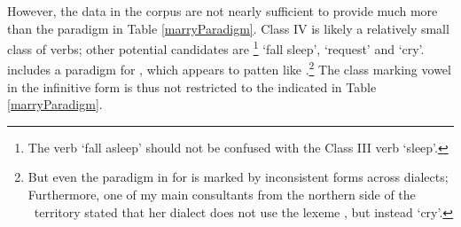However, the data in the corpus are not nearly sufficient to provide much more than the paradigm in Table \vref{marryParadigm}. %
Class IV is likely a relatively small class of verbs; other potential candidates are \mbox{}\footnote{The verb  ‘fall asleep’ should not be confused with the Class III verb {} ‘sleep’.} %
‘fall sleep’,  ‘request’ and  ‘cry’. \citet[154]{Lehtiranta1992} includes a paradigm for , which appears to patten like .\footnote{But even the paradigm in \citet[154]{Lehtiranta1992} for  is marked by inconsistent forms across dialects; Furthermore, one of my main consultants from the northern side of the \PS\ territory stated that her dialect does not use the lexeme , but instead  ‘cry’.} 
The class marking vowel in the infinitive form is thus not restricted to the  indicated in Table \vref{marryParadigm}. 

